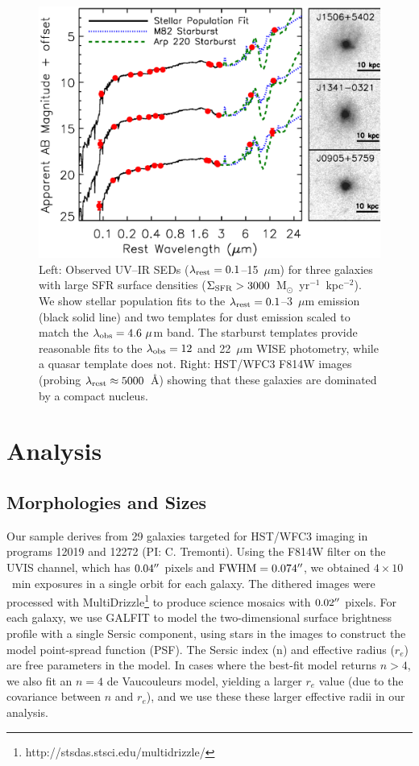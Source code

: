 \documentclass[apj]{emulateapj}
\newcommand{\units}{M$_{\odot}$~yr$^{-1}$~kpc$^{-2}$}
\newcommand{\lrest}{\lambda_{\textnormal{\scriptsize{rest}}}}
\newcommand{\lobs}{\lambda_{\textnormal{\scriptsize{obs}}}}
\newcommand{\sigmasfr}{\Sigma_{\textnormal{\scriptsize{SFR}}}}
\begin{document}
\begin{figure}[!t]
\includegraphics[angle=0,scale=0.41]{3seds.ps}
\caption{Left: Observed UV--IR SEDs ($\lrest=0.1$--15~$\mu$m) for
  three galaxies with large SFR surface densities
  ($\sigmasfr>3000$~\units).  We show stellar population fits to the
  $\lrest=0.1$--3~$\mu$m emission (black solid line) and two templates
  for dust emission \citep[M82 starburst, Arp 220 starburst;][]{pol07}
  scaled to match the $\lobs=4.6~\mu$m band.  The starburst templates
  provide reasonable fits to the $\lobs=12$ and 22~$\mu$m WISE
  photometry, while a quasar template does not.  Right: HST/WFC3 F814W
  images (probing $\lrest\approx5000$~\AA) showing that these galaxies
  are dominated by a compact nucleus.}
\label{fig:seds}
\end{figure}


\section{Analysis}

\subsection{Morphologies and Sizes}

Our sample derives from 29 galaxies targeted for HST/WFC3 imaging in
programs 12019 and 12272 (PI: C. Tremonti).  Using the F814W filter on
the UVIS channel, which has $0.04\mbox{$^{\prime\prime}$}$ pixels and
$\textnormal{FWHM}=0.074\mbox{$^{\prime\prime}$}$, we obtained $4\times10$~min
exposures in a single orbit for each galaxy.  The dithered images were
processed with
MultiDrizzle\footnote{http://stsdas.stsci.edu/multidrizzle/} to
produce science mosaics with $0.02\mbox{$^{\prime\prime}$}$ pixels.  For each galaxy,
we use GALFIT \citep{pen02} to model the two-dimensional surface
brightness profile with a single Sersic component, using stars in the
images to construct the model point-spread function (PSF).  The Sersic
index (n) and effective radius ($r_e$) are free parameters in the
model.  In cases where the best-fit model returns $n>4$, we also fit
an $n=4$ de Vaucouleurs model, yielding a larger $r_e$ value (due to
the covariance between $n$ and $r_e$), and we use these these larger
effective radii in our analysis.
\end{document}
